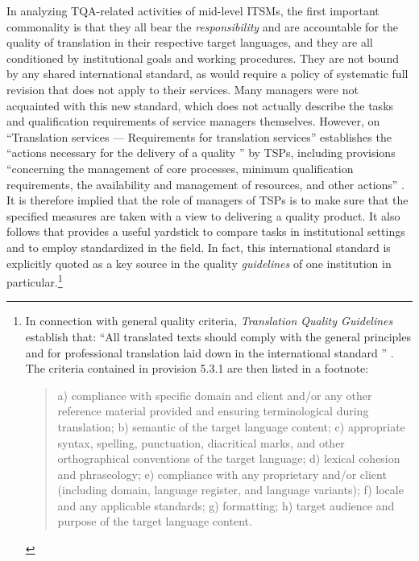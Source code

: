 \documentclass[output=paper]{langsci/langscibook}
\begin{document}
In analyzing TQA-related activities of mid-level ITSMs, the first important commonality is that they all bear the \textit{responsibility} and are accountable for the quality of translation in their respective target languages, and they are all conditioned by institutional goals and working procedures. They are not bound by any shared international standard, as \citeauthor{ISO2015} would require a policy of systematic full revision that does not apply to their services. Many managers were not acquainted with this new standard, which does not actually describe the tasks and qualification requirements of service managers themselves. However, \citeauthor{ISO2015} on “Translation services — Requirements for translation services” establishes the “actions necessary for the delivery of a quality ” by TSPs, including provisions “concerning the management of core processes, minimum qualification requirements, the availability and management of resources, and other actions” \citep[vi]{ISO2015}. It is therefore implied that the role of managers of TSPs is to make sure that the specified measures are taken with a view to delivering a quality product. It also follows that \citeauthor{ISO2015} provides a useful yardstick to compare  tasks in institutional settings and to employ standardized  in the field. In fact, this international standard is explicitly quoted as a key source in the quality \textit{guidelines} of one  institution in particular.\footnote{In connection with general quality criteria, \textit{ Translation Quality Guidelines} establish that: “All translated texts should comply with the general principles and  for professional translation laid down in the international standard  ” \citep[3]{DGT2015a}. The criteria contained in  provision 5.3.1 \citep[10]{ISO2015} are then listed in a footnote: 
\begin{quote}
a) compliance with specific domain and client  and/or any other reference material provided and ensuring terminological  during translation; b) semantic  of the target language content; c) appropriate syntax, spelling, punctuation, diacritical marks, and other orthographical conventions of the target language; d) lexical cohesion and phraseology; e) compliance with any proprietary and/or client  (including domain, language register, and language variants); f) locale and any applicable standards; g) formatting; h) target audience and purpose of the target language content.
\end{quote}
}
\end{document}
